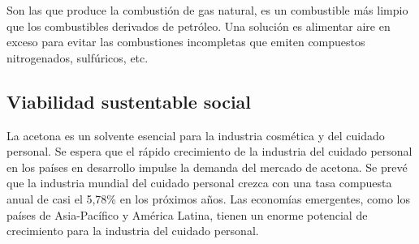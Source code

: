     Son las que produce la combustión de gas natural, es un combustible más limpio que los combustibles derivados de petróleo. Una solución es alimentar aire en exceso para evitar las combustiones incompletas que emiten compuestos nitrogenados, sulfúricos, etc.


    \subsection*{Viabilidad sustentable social}
    La acetona es un solvente esencial para la industria cosmética y del cuidado personal. Se espera que el rápido crecimiento de la industria del cuidado personal en los países en desarrollo impulse la demanda del mercado de acetona. Se prevé que la industria mundial del cuidado personal crezca con una tasa compuesta anual de casi el 5,78\% en los próximos años. Las economías emergentes, como los países de Asia-Pacífico y América Latina, tienen un enorme potencial de crecimiento para la industria del cuidado personal.

